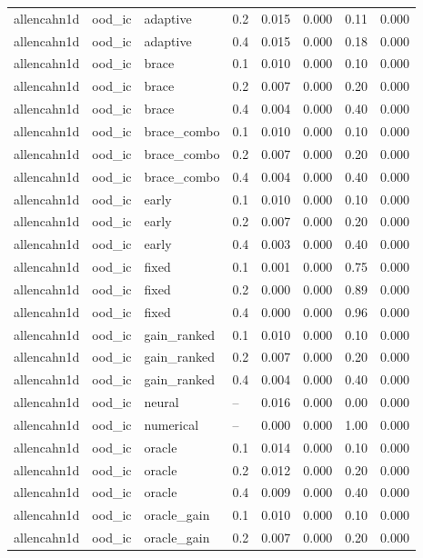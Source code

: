 \begin{tabular}{llllrrrr}
allencahn1d & ood\_ic & adaptive & 0.2 & 0.015 & 0.000 & 0.11 & 0.000 \\
allencahn1d & ood\_ic & adaptive & 0.4 & 0.015 & 0.000 & 0.18 & 0.000 \\
allencahn1d & ood\_ic & brace & 0.1 & 0.010 & 0.000 & 0.10 & 0.000 \\
allencahn1d & ood\_ic & brace & 0.2 & 0.007 & 0.000 & 0.20 & 0.000 \\
allencahn1d & ood\_ic & brace & 0.4 & 0.004 & 0.000 & 0.40 & 0.000 \\
allencahn1d & ood\_ic & brace\_combo & 0.1 & 0.010 & 0.000 & 0.10 & 0.000 \\
allencahn1d & ood\_ic & brace\_combo & 0.2 & 0.007 & 0.000 & 0.20 & 0.000 \\
allencahn1d & ood\_ic & brace\_combo & 0.4 & 0.004 & 0.000 & 0.40 & 0.000 \\
allencahn1d & ood\_ic & early & 0.1 & 0.010 & 0.000 & 0.10 & 0.000 \\
allencahn1d & ood\_ic & early & 0.2 & 0.007 & 0.000 & 0.20 & 0.000 \\
allencahn1d & ood\_ic & early & 0.4 & 0.003 & 0.000 & 0.40 & 0.000 \\
allencahn1d & ood\_ic & fixed & 0.1 & 0.001 & 0.000 & 0.75 & 0.000 \\
allencahn1d & ood\_ic & fixed & 0.2 & 0.000 & 0.000 & 0.89 & 0.000 \\
allencahn1d & ood\_ic & fixed & 0.4 & 0.000 & 0.000 & 0.96 & 0.000 \\
allencahn1d & ood\_ic & gain\_ranked & 0.1 & 0.010 & 0.000 & 0.10 & 0.000 \\
allencahn1d & ood\_ic & gain\_ranked & 0.2 & 0.007 & 0.000 & 0.20 & 0.000 \\
allencahn1d & ood\_ic & gain\_ranked & 0.4 & 0.004 & 0.000 & 0.40 & 0.000 \\
allencahn1d & ood\_ic & neural & -- & 0.016 & 0.000 & 0.00 & 0.000 \\
allencahn1d & ood\_ic & numerical & -- & 0.000 & 0.000 & 1.00 & 0.000 \\
allencahn1d & ood\_ic & oracle & 0.1 & 0.014 & 0.000 & 0.10 & 0.000 \\
allencahn1d & ood\_ic & oracle & 0.2 & 0.012 & 0.000 & 0.20 & 0.000 \\
allencahn1d & ood\_ic & oracle & 0.4 & 0.009 & 0.000 & 0.40 & 0.000 \\
allencahn1d & ood\_ic & oracle\_gain & 0.1 & 0.010 & 0.000 & 0.10 & 0.000 \\
allencahn1d & ood\_ic & oracle\_gain & 0.2 & 0.007 & 0.000 & 0.20 & 0.000 \\

\end{tabular}
